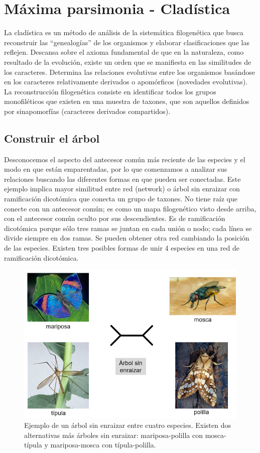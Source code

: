 \chapter{Máxima parsimonia - Cladística}
La cladística es un método de análisis de la sistemática filogenética que busca reconstruir las “genealogías” de los organismos y elaborar clasificaciones que las reflejen. Descansa sobre el axioma fundamental de que en la naturaleza, como resultado de la evolución, existe un orden que se manifiesta en las similitudes de los caracteres. Determina las relaciones evolutivas entre los organismos basándose en los caracteres relativamente derivados o apomórficos (novedades evolutivas). La reconstrucción filogenética consiste en identificar todos los grupos monofiléticos que existen en una muestra de taxones, que son aquellos definidos por sinapomorfías (caracteres derivados compartidos).

\section{Construir el árbol}
Desconocemos el aspecto del antecesor común más reciente de las especies y el modo en que están emparentadas, por lo que comenzamos a analizar sus relaciones buscando las diferentes formas en que pueden ser conectadas. Este ejemplo implica mayor similitud entre red (network) o árbol sin enraizar con ramificación dicotómica que conecta un grupo de taxones. No tiene raíz que conecte con un antecesor común; es como un mapa filogenético visto desde arriba, con el antecesor común oculto por sus descendientes. Es de ramificación dicotómica porque sólo tres ramas se juntan en cada unión o nodo; cada línea se divide siempre en dos ramas. Se pueden obtener otra red cambiando la posición de las especies. Existen tres posibles formas de unir 4 especies en una red de ramificación dicotómica. 

\begin{figure}[htbp]
\centering
\includegraphics[width=0.5\linewidth]{figs/ejemplo-arbol-sin-enraizar.png}
\caption{Ejemplo de un árbol sin enraizar entre cuatro especies. Existen dos alternativas más árboles sin enraizar: mariposa-polilla con mosca-típula y mariposa-mosca con típula-polilla.}
\end{figure}

